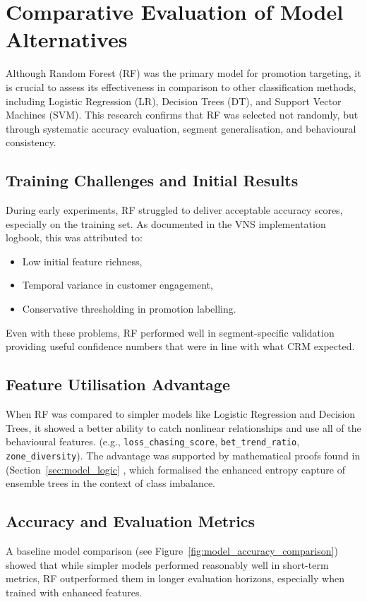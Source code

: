 \documentclass[12pt,a4paper]{report}
\begin{document}

\section{Comparative Evaluation of Model Alternatives}
\label{sec:model_comparison}

Although Random Forest (RF) was the primary model for promotion targeting, it is crucial to assess its effectiveness in comparison to other classification methods, including Logistic Regression (LR), Decision Trees (DT), and Support Vector Machines (SVM). This research confirms that RF was selected not randomly, but through systematic accuracy evaluation, segment generalisation, and behavioural consistency.

\subsection*{Training Challenges and Initial Results}
During early experiments, RF struggled to deliver acceptable accuracy scores, especially on the training set. As documented in the VNS implementation logbook, this was attributed to:
\begin{itemize}
    \item Low initial feature richness,
    \item Temporal variance in customer engagement,
    \item Conservative thresholding in promotion labelling.
\end{itemize}

Even with these problems, RF performed well in segment-specific validation providing useful confidence numbers that were in line with what CRM expected.

\subsection*{Feature Utilisation Advantage}
When RF was compared to simpler models like Logistic Regression and Decision Trees, it showed a better ability to catch nonlinear relationships and use all of the behavioural features. (e.g., \texttt{loss\_chasing\_score}, \texttt{bet\_trend\_ratio}, \texttt{zone\_diversity}). The advantage was supported by mathematical proofs found in (Section~\ref{sec:model_logic} , which formalised the enhanced entropy capture of ensemble trees in the context of class imbalance.

\subsection*{Accuracy and Evaluation Metrics}
A baseline model comparison (see Figure~\ref{fig:model_accuracy_comparison}) showed that while simpler models performed reasonably well in short-term metrics, RF outperformed them in longer evaluation horizons, especially when trained with enhanced features.
\end{document}
